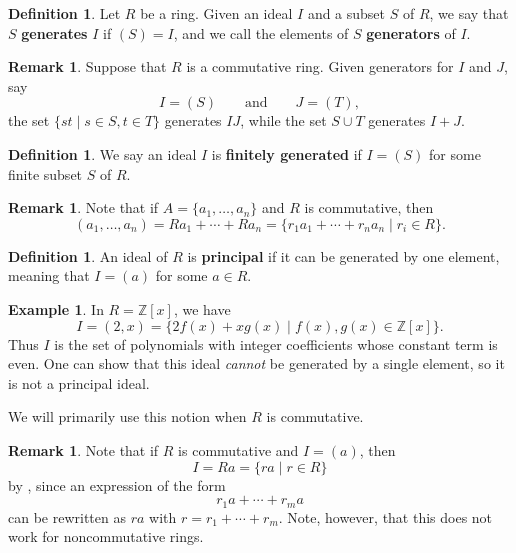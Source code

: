 \documentclass[12pt]{report}
\numberwithin{equation}{section}
\numberwithin{theorem}{chapter}
\theoremstyle{definition}
\newtheorem{definition}[theorem]{Definition}
\newtheorem{example}[theorem]{Example}
\newtheorem*{basic properties}{Basic Properties}
\newtheorem*{Important Remark}{Important Remark}
\newtheorem{remark}[theorem]{Remark}
\begin{document}
\begin{definition}
Let $R$ be a ring. Given an ideal $I$ and a subset $S$ of $R$, we say that $S$ {\bf generates} $I$ if $(S) = I$, and we call the elements of $S$ {\bf generators} of $I$.
\end{definition}



\begin{remark}
Suppose that $R$ is a commutative ring. Given generators for $I$ and $J$, say
	$$I = (S) \qquad \text{and} \qquad J = (T),$$
	the set $\{ st \mid s \in S, t \in T \}$
	generates $IJ$, while the set $S \cup T$ generates $I + J$.
\end{remark}


\begin{definition}
We say an ideal $I$ is {\bf finitely generated} if $I = (S)$ for some finite subset $S$ of $R$.
\end{definition}


\begin{remark}
Note that if  $A = \{a_1, \dots, a_n \}$ and $R$ is commutative, then 
$$(a_1, \ldots, a_n) = Ra_1 + \cdots + Ra_n = \{r_1a_1 + \cdots + r_na_n \mid r_i \in R\}.$$ 
\end{remark}




\begin{definition}
An ideal of $R$ is {\bf principal} if it can be generated by one element, meaning that $I = (a)$ for some $a \in R$.
\end{definition}

\begin{example}\label{(2,x) not principal}
	In $R = \mathbb{Z}[x]$, we have 
$$I = (2 , x) = \{2f(x)+xg(x) \mid f(x), g(x) \in\mathbb{Z}[x]\}.$$ 
Thus $I$ is the set of polynomials with integer coefficients whose constant term is
  even. One can show that this ideal {\em cannot} be generated by a single element, so it is not a principal ideal.
\end{example}


We will primarily use this notion when $R$ is commutative. 

\begin{remark}
Note that if $R$ is commutative and $I = (a)$, then 
$$I = Ra = \{ra \mid r \in R\}$$ by , since an expression of the form 
$$r_1 a + \cdots + r_m a$$ 
can be rewritten as $ra$ with $r = r_1+ \cdots + r_m$. Note, however, that this does not work for noncommutative rings.
\end{remark}
\end{document}
